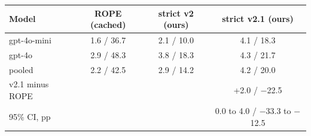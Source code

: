 \begin{tabular}{@{}lccc@{}}
\toprule
Model & ROPE (cached) & \textbf{strict v2 (ours)} & \textbf{strict v2.1 (ours)} \\
\midrule
gpt-4o-mini & 1.6 / 36.7 & 2.1 / 10.0 & 4.1 / 18.3 \\
gpt-4o & 2.9 / 48.3 & 3.8 / 18.3 & 4.3 / 21.7 \\
pooled & 2.2 / 42.5 & 2.9 / 14.2 & 4.2 / 20.0 \\
v2.1 minus ROPE & & & +2.0 / $-$22.5 \\
95\% CI, pp &  &  & 0.0 to 4.0 / $-$33.3 to $-$12.5 \\
\bottomrule
\end{tabular}
